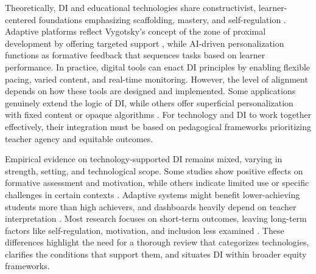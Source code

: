 \documentclass[english]{textolivre}
\begin{document}
Theoretically, DI and educational technologies share constructivist, learner-centered foundations emphasizing scaffolding, mastery, and self-regulation \cite{damyanov2024, donkoh2024, guo2024}. Adaptive platforms reflect Vygotsky’s concept of the zone of proximal development by offering targeted support \cite{damyanov2024, donkoh2024, guo2024}, while AI-driven personalization functions as formative feedback that sequences tasks based on learner performance. In practice, digital tools can enact DI principles by enabling flexible pacing, varied content, and real-time monitoring. However, the level of alignment depends on how these tools are designed and implemented. Some applications genuinely extend the logic of DI, while others offer superficial personalization with fixed content or opaque algorithms \cite{burner2025, chang2023, kochmar2021, liao2024, murtaza2022}. For technology and DI to work together effectively, their integration must be based on pedagogical frameworks prioritizing teacher agency and equitable outcomes.

Empirical evidence on technology-supported DI remains mixed, varying in strength, setting, and technological scope. Some studies show positive effects on formative assessment and motivation, while others indicate limited use or specific challenges in certain contexts \cite{burner2025, sree2024}. Adaptive systems might benefit lower-achieving students more than high achievers, and dashboards heavily depend on teacher interpretation \cite{molenaar2019, pozdniakov2025}. Most research focuses on short-term outcomes, leaving long-term factors like self-regulation, motivation, and inclusion less examined \cite{farrokhnia2025, held2024, zafar2024}. These differences highlight the need for a thorough review that categorizes technologies, clarifies the conditions that support them, and situates DI within broader equity frameworks.
\end{document}
